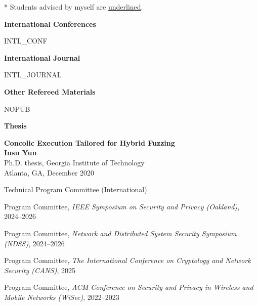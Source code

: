 \documentclass[11pt,letterpaper]{article}
\begin{document}
%
%


* Students advised by myself are \underline{underlined}.

\textbf{International Conferences }
\begin{etaremune}
  {{ INTL_CONF }}
\end{etaremune}

\textbf{International Journal}
\begin{etaremune}
  {{ INTL_JOURNAL }}
\end{etaremune}

\textbf{Other Refereed Materials}
\begin{etaremune}
  {{ NOPUB }}
\end{etaremune}

\textbf{Thesis}
\begin{etaremune}
\item \textbf{Concolic Execution Tailored for Hybrid Fuzzing}  \\
{\footnotesize
  \textbf{Insu Yun} \\
  Ph.D. thesis, Georgia Institute of Technology \\
Atlanta, GA, December 2020
}
\end{etaremune}

\begin{topic}{Technical Program Committee (International)}{}
  \item{Program Committee, \emph{IEEE Symposium on Security and Privacy (Oakland)}, 2024--2026}
  \item{Program Committee, \emph{Network and Distributed System Security Symposium (NDSS)}, 2024--2026}
  \item{Program Committee, \emph{The International Conference on Cryptology and Network Security (CANS)}, 2025}
  \item{Program Committee, \emph{ACM Conference on Security and Privacy in Wireless and Mobile Networks (WiSec)}, 2022--2023}
\end{topic}
\end{document}

